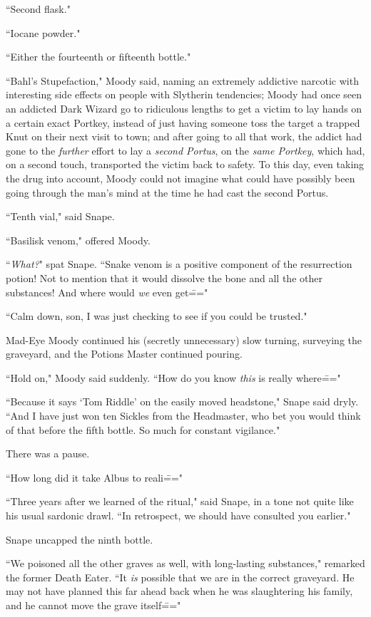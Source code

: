 ``Second flask."

``Iocane powder."

``Either the fourteenth or fifteenth bottle."

``Bahl's Stupefaction," Moody said, naming an extremely addictive narcotic with interesting side effects on people with Slytherin tendencies; Moody had once seen an addicted Dark Wizard go to ridiculous lengths to get a victim to lay hands on a certain exact Portkey, instead of just having someone toss the target a trapped Knut on their next visit to town; and after going to all that work, the addict had gone to the \emph{further} effort to lay a \emph{second Portus}, on the \emph{same Portkey}, which had, on a second touch, transported the victim back to safety. To this day, even taking the drug into account, Moody could not imagine what could have possibly been going through the man's mind at the time he had cast the second Portus.

``Tenth vial," said Snape.

``Basilisk venom," offered Moody.

``\emph{What?}" spat Snape. ``Snake venom is a positive component of the resurrection potion! Not to mention that it would dissolve the bone and all the other substances! And where would \emph{we} even get\==="

``Calm down, son, I was just checking to see if you could be trusted."

Mad-Eye Moody continued his (secretly unnecessary) slow turning, surveying the graveyard, and the Potions Master continued pouring.

``Hold on," Moody said suddenly. ``How do you know \emph{this} is really where\==="

``Because it says `Tom Riddle' on the easily moved headstone," Snape said dryly. ``And I have just won ten Sickles from the Headmaster, who bet you would think of that before the fifth bottle. So much for constant vigilance."

There was a pause.

``How long did it take Albus to reali\==="

``Three years after we learned of the ritual," said Snape, in a tone not quite like his usual sardonic drawl. ``In retrospect, we should have consulted you earlier."

Snape uncapped the ninth bottle.

``We poisoned all the other graves as well, with long-lasting substances," remarked the former Death Eater. ``It \emph{is} possible that we are in the correct graveyard. He may not have planned this far ahead back when he was slaughtering his family, and he cannot move the grave itself\==="

